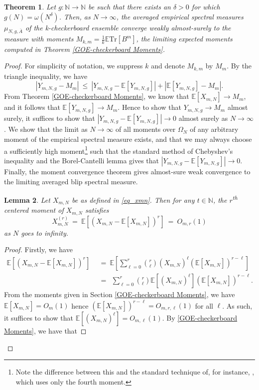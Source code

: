 \documentclass[11pt,reqno]{amsart}
\numberwithin{equation}{section}
\newtheorem{thm}{Theorem}[section]
\newtheorem{lem}[thm]{Lemma}
\theoremstyle{plain}
\newcommand{\N}{\mathbb{N}}
\newcommand{\E}[1]{\mathbb{E}[#1]}
\begin{document}
\begin{thm}\label{thm_as_convergence}
Let $g: \mathbb{N} \rightarrow \mathbb{N}$ be such that there exists an $\delta>0$ for which $g(N) = \omega(N^\delta)$. Then, as $N\to\infty$, the averaged empirical spectral measures $\mu_{N,g,\overline{A}}$ of the k-checkerboard ensemble converge weakly almost-surely to the measure with moments $M_{k,m}=\frac{1}{k} \mathbb{E}\text{Tr}[B^m]$, the limiting expected moments computed in Theorem \ref{GOE-checkerboard Moments}.
\end{thm}
\begin{proof}

For simplicity of notation, we suppress $k$ and denote $M_{k,m}$ by $M_m$. By the triangle inequality, we have
\begin{equation}\label{eqn_tri_ineq_y}
|Y_{m,N,g}-M_m|\ \leq\ |Y_{m,N,g}-\E{Y_{m,N,g}}|+|\E{Y_{m,N,g}}-M_m|.
\end{equation}
From Theorem \ref{GOE-checkerboard Moments}, we know that $\E{X_{m,N}} \to M_m$, and it follows that $\E{Y_{m,N,g}} \to M_m$. Hence to show that $Y_{m,N,g} \to M_m$ almost surely, it suffices to show that $|Y_{m,N,g} - \E{Y_{m,N,g}}|\to 0$ almost surely as $N \rightarrow \infty$.
We show that the limit as $N \rightarrow \infty$ of all moments over $\Omega_N$ of any arbitrary moment of the empirical spectral measure exists, and that we may always choose a sufficiently high moment\footnote{Note the difference between this and the standard technique of, for instance, \cite{Toeplitz}, which uses only the fourth moment.} such that the standard method of Chebyshev's inequality and the Borel-Cantelli lemma gives that $|Y_{m,N,g}-\E{Y_{m,N,g}}|\to 0$. Finally, the moment convergence theorem gives almost-sure weak convergence to the limiting averaged blip spectral measure.

\begin{lem}\label{lem_moments_of_moments}
Let $X_{m,N}$ be as defined in \eqref{eq_xmn}. %
Then for any $t \in \N$, the $r$\textsuperscript{th} centered moment of $X_{m,N}$ satisfies
\begin{equation}
X_{m,N}^{(r)} \ =\ \E{\left(X_{m,N}-\E{X_{m,N}}\right)^r}\ =\ O_{m,r}(1)
\end{equation}
as $N$ goes to infinity.
\end{lem}
\begin{proof}
Firstly, we have
\begin{align}
 \E{\left(X_{m,N}-\E{X_{m,N}}\right)^r}\ &\ =\  \mathbb{E}\left[\sum_{\ell=0}^r \binom{r}{\ell}(X_{m,N})^\ell \left(\E{X_{m,N}}\right)^{r-\ell}\right]\  \nonumber \\
 &\ =\ \ \sum_{\ell=0}^r \binom{r}{\ell}\mathbb{E}\left[(X_{m,N})^\ell\right] \left(\E{X_{m,N}}\right)^{r-\ell}.
\end{align}
From the moments given in Section \ref{GOE-checkerboard Moments}, we have $\E{X_{m,N}}=O_m(1)$ hence $\left(\E{X_{m,N}}\right)^{r-\ell}=O_{m,r,\ell}(1)$ for all $\ell$. As such, it suffices to show that $\E{(X_{m,N})^\ell}=O_{m,\ell}(1)$.
By \eqref{GOE-checkerboard Moments}, we have that


\end{proof}
\end{proof}
\end{document}
